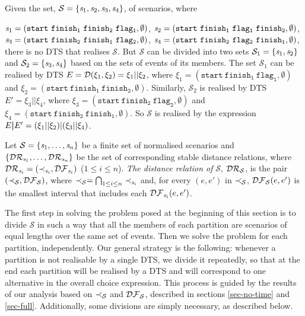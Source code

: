 \begin{example}
\label{ex-one-flag}
Given the set, $\mathcal{S}=\{\mathit{s}_1,\mathit{s}_2,\mathit{s}_3,\mathit{s}_4\}$, of
scenarios, where

\noindent
$\mathit{s}_1=(\mathtt{start}~ \mathtt{finish_1}~ \mathtt{finish_2}~ \mathtt{flag_1},\emptyset)$,
$\mathit{s}_2=(\mathtt{start}~ \mathtt{finish_1}~  \mathtt{flag_1}~ \mathtt{finish_2},\emptyset)$,
$\mathit{s}_3=(\mathtt{start}~ \mathtt{finish_2}~ \mathtt{finish_1}~ \mathtt{flag_2},\emptyset)$,
$\mathit{s}_4=(\mathtt{start}~ \mathtt{finish_2}~ \mathtt{flag_2}~ \mathtt{finish_1},\emptyset)$,
there is no DTS that realises $\mathcal{S}$.
But $\mathcal{S}$ can be divided into two sets
$\mathcal{S}_{1}=\{\mathit{s}_1,\mathit{s}_2\}$ and
$\mathcal{S}_2=\{\mathit{s}_3,\mathit{s}_4\}$ based on the sets of events of its
members. The set ${\mathcal{S}}_{1}$ can be realised by DTS
$E=\mathcal{D}(\xi_1,\xi_2)=\xi_1||\xi_2$, where
$\xi_1=(\mathtt{start}~ \mathtt{finish_1}~ \mathtt{flag_1},\emptyset)$
and
$\xi_2=(\mathtt{start}~ \mathtt{finish_1}~ \mathtt{finish_2},\emptyset)$.
Similarly, $\mathcal{S}_2$ is realised by DTS
$E'=\xi_3||\xi_4$, where
$\xi_3=(\mathtt{start}~ \mathtt{finish_2}~ \mathtt{flag_2},\emptyset)$
and
$\xi_4=(\mathtt{start}~ \mathtt{finish_2}~ \mathtt{finish_1},\emptyset)$.
So $\mathcal{S}$ is realised by the expression
$E\boldsymbol{|} E'=(\xi_1||\xi_2)|(\xi_3||\xi_4)$.
\end{example}
\vspace{-0.5em}
\begin{definition}
  \label{def-DR-S}
Let $\mathcal{S}=\{\mathit{s}_1,\dots,\mathit{s}_n\}$ be a finite set of
normalised scenarios
and
$\{\mathcal{DR}_{\mathit{s}_1},\dots,\mathcal{DR}_{\mathit{s}_n}\}$ be the set of
corresponding stable distance relations, where
$\mathcal{DR}_{\mathit{s}_i}=(\prec_{\mathit{s}_i},\mathcal{DF}_{\mathit{s}_i})$ ($1\leq i\leq n$).
\emph{The distance relation of} $\mathcal{S}$, $\mathcal{DR}_{\mathcal{S}}$, is
the pair $(\prec_{\mathcal{S}},\mathcal{DF}_{\mathcal{S}})$, where
$\prec_{\mathcal{S}}=\bigcap_{1\leq i\leq n} \prec_{\mathit{s}_i}$ and,
for every $(e,e')$ in $\prec_{\mathcal{S}}$,
$\mathcal{DF}_{\mathcal{S}}(e,e')$ is
the smallest interval that includes each $\mathcal{DF}_{\mathit{s}_i}(e,e')$.
\end{definition}
\vspace{-0.3em}
\noindent
The first step\label{initial-partitioning-step}
 in solving the problem posed at the beginning of this
section is to divide
$\mathcal{S}$ in such a way that all the members of each partition are
scenarios of equal lengths over the same set of events.
Then we solve the problem for each partition, independently.
Our general strategy is the following: whenever a partition is not
realisable by a single DTS, we divide it
repeatedly, so that at the end each partition will be realised by a
DTS and will correspond to one alternative in the overall choice expression.
This process is guided by the results of our analysis based on
$\prec_{\mathcal{S}}$ and
$\mathcal{DF}_{\mathcal{S}}$,
described in sections \ref{sec-no-time}
and \ref{sec-full}. Additionally, some divisions are simply necessary, as
described below.
\vspace{-1em}
